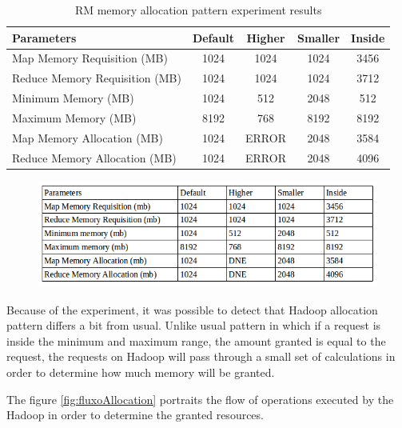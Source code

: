 \begin{table}
	\renewcommand{\figurename}{Table}
	\centering
	\begin{tabular}{|l|c|c|c|c|}
		\hline 
		Parameters & Default & Higher & Smaller & Inside\\ 
		\hline 
		Map Memory Requisition (MB) & 1024 & 1024 & 1024 & 3456\\ 
		\hline 
		Reduce Memory Requisition (MB) & 1024 & 1024 & 1024 & 3712\\ 
		\hline 
		Minimum Memory (MB) & 1024 & 512 & 2048 & 512\\ 
		\hline 
		Maximum Memory (MB) & 8192 & 768 & 8192 & 8192\\ 
		\hline 
		Map Memory Allocation (MB) & 1024 & ERROR & 2048 & 3584\\
		\hline
		Reduce Memory Allocation (MB) & 1024 & ERROR & 2048 & 4096\\ 
		\hline 		
	\end{tabular}
	\caption{RM memory allocation pattern experiment results}
	\label{tab:memory allocation}
\end{table}

\begin{figure}[!hbtn]
   \centering
   \includegraphics[width=15cm]{figuras/Figura09-allocation.png}

\end{figure}

Because of the experiment, it was possible to detect that Hadoop allocation pattern differs a bit from usual. Unlike usual pattern in which if a request is inside the minimum and maximum range, the amount granted is equal to the request, the requests on Hadoop will pass through a small set of calculations in order to determine how much memory will be granted.

The figure \ref{fig:fluxoAllocation} portraits the  flow of operations executed by the Hadoop in order to determine the granted resources.

